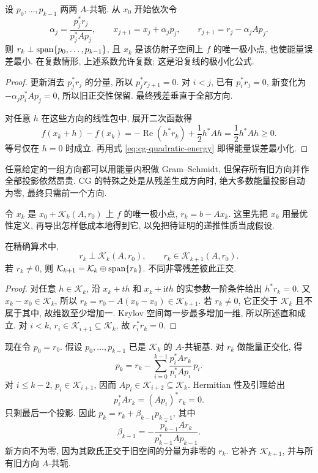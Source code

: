\begin{proposition}[共轭方向的联合极小化]\label{prop:conjugate-directions}
设 $p_0,\ldots,p_{k-1}$ 两两 $A$-共轭. 从 $x_0$ 开始依次令
\[
\alpha_j=\frac{p_j^*r_j}{p_j^*Ap_j},\qquad
x_{j+1}=x_j+\alpha_jp_j,\qquad
r_{j+1}=r_j-\alpha_jAp_j.
\]
则 $r_k\perp\operatorname{span}\{p_0,\ldots,p_{k-1}\}$, 且 $x_k$ 是该仿射子空间上 $f$ 的唯一极小点, 也使能量误差最小. 在复数情形, 上述系数允许复数; 这是沿复线的极小化公式.
\end{proposition}
\begin{proof}
更新消去 $p_j^*r_j$ 的分量, 所以 $p_j^*r_{j+1}=0$. 对 $i<j$, 已有 $p_i^*r_j=0$, 新变化为 $-\alpha_jp_i^*Ap_j=0$, 所以旧正交性保留. 最终残差垂直于全部方向.

对任意 $h$ 在这些方向的线性包中, 展开二次函数得
\[
f(x_k+h)-f(x_k)=-\operatorname{Re}(h^*r_k)+\frac12h^*Ah
=\frac12h^*Ah\ge0.
\]
等号仅在 $h=0$ 时成立. 再用式 \eqref{eq:cg-quadratic-energy} 即得能量误差最小化.
\end{proof}
任意给定的一组方向都可以用能量内积做 Gram--Schmidt, 但保存所有旧方向并作全部投影依然昂贵. CG 的特殊之处是从残差生成方向时, 绝大多数能量投影自动为零, 最终只需前一个方向.

令 $x_k$ 是 $x_0+\mathcal K_k(A,r_0)$ 上 $f$ 的唯一极小点, $r_k=b-Ax_k$. 这里先把 $x_k$ 用最优性定义, 再导出怎样低成本地得到它, 以免把待证明的递推性质当成假设.

\begin{lemma}\label{lem:cg-residual-space}
在精确算术中,
\[
r_k\perp\mathcal K_k(A,r_0),\qquad r_k\in\mathcal K_{k+1}(A,r_0).
\]
若 $r_k\ne0$, 则 $\mathcal K_{k+1}=\mathcal K_k\oplus\operatorname{span}\{r_k\}$. 不同非零残差彼此正交.
\end{lemma}
\begin{proof}
对任意 $h\in\mathcal K_k$, 沿 $x_k+th$ 和 $x_k+\mathrm it h$ 的实参数一阶条件给出 $h^*r_k=0$. 又 $x_k-x_0\in\mathcal K_k$, 所以
$r_k=r_0-A(x_k-x_0)\in\mathcal K_{k+1}$. 若 $r_k\ne0$, 它正交于 $\mathcal K_k$ 且不属于其中, 故维数至少增加一. Krylov 空间每一步最多增加一维, 所以所述直和成立. 对 $i<k$, $r_i\in\mathcal K_{i+1}\subseteq\mathcal K_k$, 故 $r_i^*r_k=0$.
\end{proof}

现在令 $p_0=r_0$. 假设 $p_0,\ldots,p_{k-1}$ 已是 $\mathcal K_k$ 的 $A$-共轭基. 对 $r_k$ 做能量正交化, 得
\[
p_k=r_k-\sum_{i=0}^{k-1}
\frac{p_i^*Ar_k}{p_i^*Ap_i}\,p_i.
\]
对 $i\le k-2$, $p_i\in\mathcal K_{i+1}$, 因而 $Ap_i\in\mathcal K_{i+2}\subseteq\mathcal K_k$. Hermitian 性及引理给出
\[
p_i^*Ar_k=(Ap_i)^*r_k=0.
\]
只剩最后一个投影. 因此 $p_k=r_k+\beta_{k-1}p_{k-1}$, 其中
\[
\beta_{k-1}=-\frac{p_{k-1}^*Ar_k}{p_{k-1}^*Ap_{k-1}}.
\]
新方向不为零, 因为其欧氏正交于旧空间的分量为非零的 $r_k$. 它补齐 $\mathcal K_{k+1}$, 并与所有旧方向 $A$-共轭.

